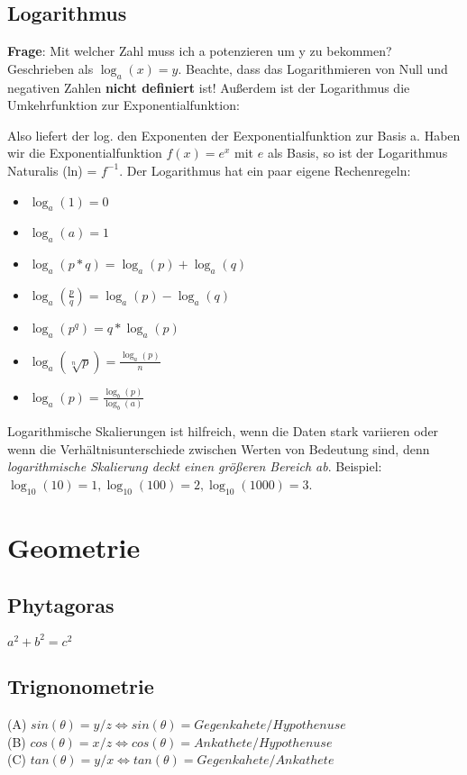 \documentclass[letterpaper, titlepage]{article}
\begin{document}
\subsection{Logarithmus}\label{Logarithmus}
\textbf{Frage}: Mit welcher Zahl muss ich a potenzieren um y zu bekommen? Geschrieben als $\log_a(x)=y$. Beachte, dass das Logarithmieren von Null und negativen Zahlen \textbf{nicht definiert} ist! 
\skiptwolines
Außerdem ist der Logarithmus die Umkehrfunktion zur Exponentialfunktion:
 
Also liefert der log. den Exponenten der Eexponentialfunktion zur Basis a. Haben wir die Exponentialfunktion $f(x)=e^x$ mit $e$ als Basis, so ist der Logarithmus Naturalis (ln) = $f^{-1}$. Der Logarithmus hat ein paar eigene Rechenregeln:\\
\begin{itemize}
    \item $\log_a(1)=0$
    \item $\log_a(a)=1$
    \item $\log_a(p*q)=\log_a(p)+\log_a(q)$
    \item $\log_a(\frac{p}{q})=\log_a(p)-\log_a(q)$
    \item $\log_a(p^q)=q*\log_a(p)$
    \item $\log_a(\sqrt[n]{p})=\frac{\log_a(p)}{n}$
    \item $\log_a(p)=\frac{\log_b(p)}{\log_b(a)}$
\end{itemize}
\vspace{0.6cm}
Logarithmische Skalierungen ist hilfreich, wenn die Daten stark variieren oder wenn die Verhältnisunterschiede zwischen Werten von Bedeutung sind, denn \textit{logarithmische Skalierung deckt einen größeren Bereich ab}. Beispiel:
\skiptwolines
$\log_{10}(10)=1, \log_{10}(100)=2, \log_{10}(1000)=3$.


\section{Geometrie}\label{Gemoetrie}


\subsection{Phytagoras}\label{Phytagoras}
$a^2+b^2=c^2$

\subsection{Trignonometrie}\label{Trignonometrie}
(A) $sin(\theta)=y/z \Leftrightarrow sin(\theta)=Gegenkahete/Hypothenuse$ \\
(B) $cos(\theta)=x/z \Leftrightarrow cos(\theta)=Ankathete/Hypothenuse$ \\
(C) $tan(\theta)=y/x \Leftrightarrow tan(\theta)= Gegenkahete/Ankathete$ \\
\end{document}
